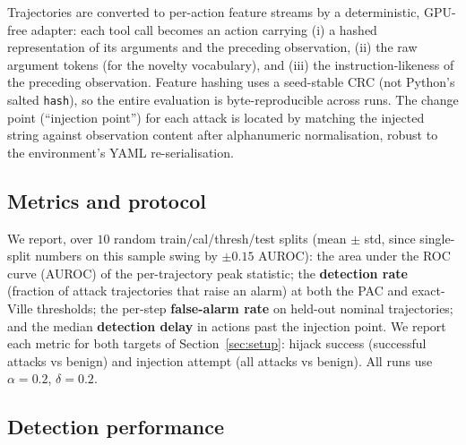 \documentclass[pdflatex,sn-mathphys-num]{sn-jnl}%
\theoremstyle{thmstyleone}%
\theoremstyle{thmstyletwo}%
\theoremstyle{thmstylethree}%
\begin{document}
Trajectories are converted to per-action feature streams by a deterministic,
GPU-free adapter: each tool call becomes an action carrying (i) a hashed
representation of its arguments and the preceding observation, (ii) the raw
argument tokens (for the novelty vocabulary), and (iii) the
instruction-likeness of the preceding observation. Feature hashing uses a
seed-stable CRC (not Python's salted \texttt{hash}), so the entire evaluation
is byte-reproducible across runs. The change point (``injection point'') for
each attack is located by matching the injected string against observation
content after alphanumeric normalisation, robust to the environment's YAML
re-serialisation.

\subsection{Metrics and protocol}

We report, over \(10\) random train/cal/thresh/test splits (mean \(\pm\)
std, since single-split numbers on this sample swing by \(\pm 0.15\) AUROC):
the area under the ROC curve (AUROC) of the per-trajectory peak statistic;
the \textbf{detection rate} (fraction of attack trajectories that raise an
alarm) at both the PAC and exact-Ville thresholds; the per-step
\textbf{false-alarm rate} on held-out nominal trajectories; and the median
\textbf{detection delay} in actions past the injection point. We report each
metric for both targets of Section~\ref{sec:setup}: hijack success
(successful attacks vs benign) and injection attempt (all attacks vs benign).
All runs use \(\alpha=0.2\), \(\delta=0.2\).

\subsection{Detection performance}\label{sec:detection}\label{sec:results}
\end{document}
